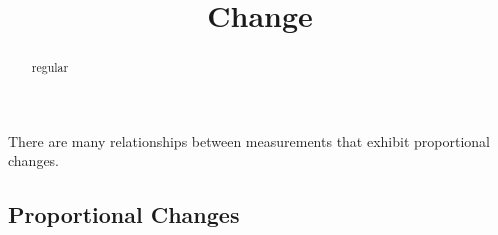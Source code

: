 \documentclass{ximera}
\title{Change}
\begin{document}
\begin{abstract}
regular
\end{abstract}
\maketitle




There are many relationships between measurements that exhibit proportional changes.  







\subsection{Proportional Changes}
\end{document}
